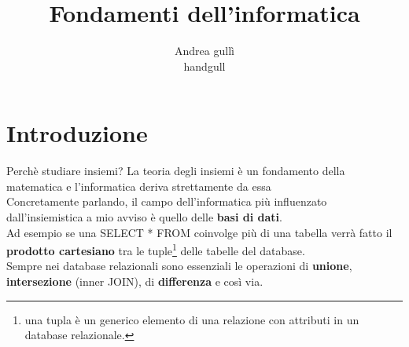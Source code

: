 \documentclass[oneside,12pt]{book}
\title{Fondamenti dell'informatica}
\author{Andrea gullì \\ handgull}
\begin{document}
\maketitle

\tableofcontents

\chapter*{Introduzione}

Perchè studiare insiemi? La teoria degli insiemi è un fondamento della matematica e l'informatica deriva strettamente da essa \\
Concretamente parlando, il campo dell'informatica più influenzato dall'insiemistica
a mio avviso è quello delle \textbf{basi di dati}. \\
Ad esempio se una SELECT * FROM coinvolge più di una tabella verrà fatto il \textbf{prodotto cartesiano} tra le tuple\footnote{una tupla è un generico elemento di una relazione con attributi in un database relazionale.} delle tabelle del database. \\
Sempre nei database relazionali sono essenziali le operazioni di \textbf{unione}, \textbf{intersezione} (inner JOIN), di \textbf{differenza} e così via.


\end{document}
